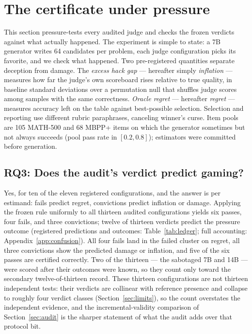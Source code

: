 \section{The certificate under pressure}
\label{sec:pressure}

This section pressure-tests every audited judge and checks the frozen verdicts against what actually happened.
The experiment is simple to state: a 7B generator writes 64 candidates per problem, each judge configuration picks its favorite, and we check what happened.
Two pre-registered quantities separate deception from damage.
The \emph{excess hack gap} --- hereafter simply \emph{inflation} --- measures how far the judge's own scoreboard rises relative to true quality, in baseline standard deviations over a permutation null that shuffles judge scores among samples with the same correctness.
\emph{Oracle regret} --- hereafter \emph{regret} --- measures accuracy left on the table against best-possible selection.
Selection and reporting use different rubric paraphrases, canceling winner's curse.
Item pools are 105 \textsc{MATH-500} and 68 \textsc{MBPP+} items on which the generator sometimes but not always succeeds (pool pass rate in $[0.2, 0.8]$); estimators were committed before generation.

\subsection*{RQ3: Does the audit's verdict predict gaming?}

Yes, for ten of the eleven registered configurations, and the answer is per estimand: fails predict regret, convictions predict inflation or damage.
Applying the frozen rule uniformly to all thirteen audited configurations yields six passes, four fails, and three convictions; twelve of thirteen verdicts predict the pressure outcome (registered predictions and outcomes: Table~\ref{tab:ledger}; full accounting: Appendix~\ref{app:confusion}).
All four fails land in the failed cluster on regret, all three convictions show the predicted damage or inflation, and five of the six passes are certified correctly.
Two of the thirteen --- the sabotaged 7B and 14B --- were scored after their outcomes were known, so they count only toward the secondary twelve-of-thirteen record.
These thirteen configurations are not thirteen independent tests: their verdicts are collinear with reference presence and collapse to roughly four verdict classes (Section~\ref{sec:limits}), so the count overstates the independent evidence, and the incremental-validity comparison of Section~\ref{sec:audit} is the sharper statement of what the audit adds over that protocol bit.

